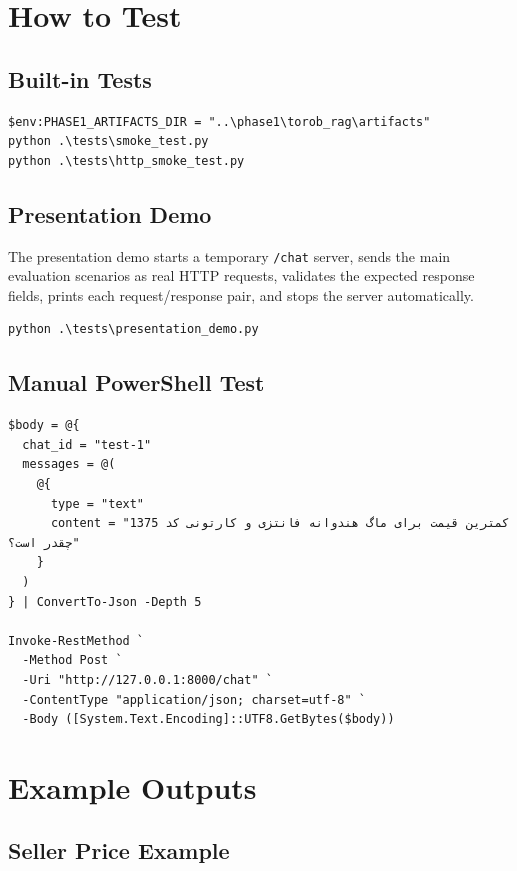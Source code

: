 \documentclass[12pt,a4paper]{article}
\begin{document}
\section{How to Test}

\subsection{Built-in Tests}

\begin{lstlisting}
$env:PHASE1_ARTIFACTS_DIR = "..\phase1\torob_rag\artifacts"
python .\tests\smoke_test.py
python .\tests\http_smoke_test.py
\end{lstlisting}

\subsection{Presentation Demo}

The presentation demo starts a temporary \texttt{/chat} server, sends the main evaluation scenarios as real HTTP requests, validates the expected response fields, prints each request/response pair, and stops the server automatically.

\begin{lstlisting}
python .\tests\presentation_demo.py
\end{lstlisting}

\subsection{Manual PowerShell Test}

\begin{lstlisting}
$body = @{
  chat_id = "test-1"
  messages = @(
    @{
      type = "text"
      content = "کمترین قیمت برای ماگ هندوانه فانتزی و کارتونی کد 1375 چقدر است؟"
    }
  )
} | ConvertTo-Json -Depth 5

Invoke-RestMethod `
  -Method Post `
  -Uri "http://127.0.0.1:8000/chat" `
  -ContentType "application/json; charset=utf-8" `
  -Body ([System.Text.Encoding]::UTF8.GetBytes($body))
\end{lstlisting}

\section{Example Outputs}

\subsection{Seller Price Example}
\end{document}
